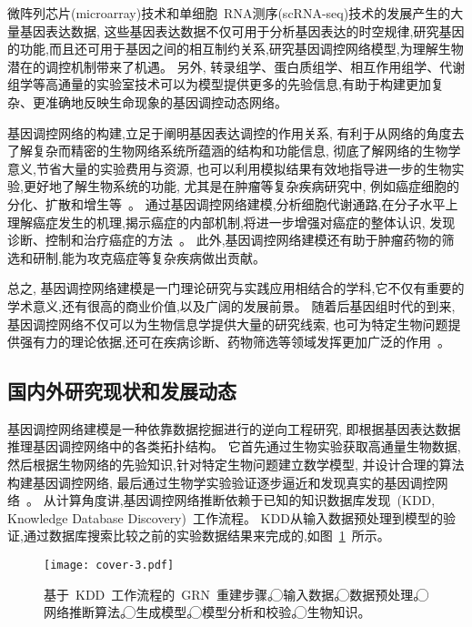 微阵列芯片(microarray)技术和单细胞~RNA测序(scRNA-seq)技术的发展产生的大量基因表达数据,
这些基因表达数据不仅可用于分析基因表达的时空规律,研究基因的功能,而且还可用于基因之间的相互制约关系,研究基因调控网络模型,为理解生物潜在的调控机制带来了机遇。
另外, 转录组学、蛋白质组学、相互作用组学、代谢组学等高通量的实验室技术可以为模型提供更多的先验信息,有助于构建更加复杂、更准确地反映生命现象的基因调控动态网络。


基因调控网络的构建,立足于阐明基因表达调控的作用关系,
有利于从网络的角度去了解复杂而精密的生物网络系统所蕴涵的结构和功能信息,
彻底了解网络的生物学意义,节省大量的实验费用与资源,
也可以利用模拟结果有效地指导进一步的生物实验,更好地了解生物系统的功能,
尤其是在肿瘤等复杂疾病研究中,
例如癌症细胞的分化、扩散和增生等~\cite{hurley2011gene}。
通过基因调控网络建模,分析细胞代谢通路,在分子水平上理解癌症发生的机理,揭示癌症的内部机制,将进一步增强对癌症的整体认识,
发现诊断、控制和治疗癌症的方法~\cite{kreeger2009cancer,yan2016biological}。
此外,基因调控网络建模还有助于肿瘤药物的筛选和研制,能为攻克癌症等复杂疾病做出贡献。

总之, 基因调控网络建模是一门理论研究与实践应用相结合的学科,它不仅有重要的学术意义,还有很高的商业价值,以及广阔的发展前景。
随着后基因组时代的到来,基因调控网络不仅可以为生物信息学提供大量的研究线索,
也可为特定生物问题提供强有力的理论依据,还可在疾病诊断、药物筛选等领域发挥更加广泛的作用~\cite{kreeger2009cancer}。

\subsection{国内外研究现状和发展动态}

基因调控网络建模是一种依靠数据挖掘进行的逆向工程研究, 即根据基因表达数据推理基因调控网络中的各类拓扑结构。
它首先通过生物实验获取高通量生物数据, 然后根据生物网络的先验知识,针对特定生物问题建立数学模型, 并设计合理的算法构建基因调控网络,
最后通过生物学实验验证逐步逼近和发现真实的基因调控网络~\cite{sima2009inference}。
从计算角度讲,基因调控网络推断依赖于已知的知识数据库发现~(KDD, Knowledge Database Discovery)~工作流程。
KDD从输入数据预处理到模型的验证,通过数据库搜索比较之前的实验数据结果来完成的,如图~\ref{cover-3}~所示。
\begin{figure}[!htbp]
    \centering
    \texttt{[image: cover-3.pdf]}
    \caption{基于~KDD~工作流程的~GRN~重建步骤。
    \textcircled{\raisebox{-0.9pt}{1}}输入数据。
    \textcircled{\raisebox{-0.9pt}{2}}数据预处理。
    \textcircled{\raisebox{-0.9pt}{3}}网络推断算法。
    \textcircled{\raisebox{-0.9pt}{4}}生成模型。
    \textcircled{\raisebox{-0.9pt}{5}}模型分析和校验。
    \textcircled{\raisebox{-0.9pt}{6}}生物知识。
    }
    \label{cover-3}
\end{figure}

